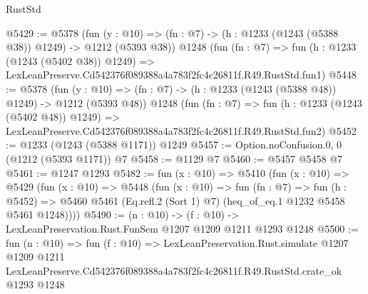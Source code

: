 \begin{lexlean}{RustStd}
\begin{coremodule}
@5429 := @5378
    (fun (y : @10) => (fn : @7) -> (h : @1233 (@1243 (@5388 @38)) @1249) -> @1212 (@5393 @38))
    @1248
    (fun (fn : @7) =>
    fun (h : @1233 (@1243 (@5402 @38)) @1249) =>
    LexLeanPreserve.Cd542376f089388a4a783f2fc4c26811f.R49.RustStd.fun1)
@5448 := @5378
    (fun (y : @10) => (fn : @7) -> (h : @1233 (@1243 (@5388 @48)) @1249) -> @1212 (@5393 @48))
    @1248
    (fun (fn : @7) =>
    fun (h : @1233 (@1243 (@5402 @48)) @1249) =>
    LexLeanPreserve.Cd542376f089388a4a783f2fc4c26811f.R49.RustStd.fun2)
@5452 := @1233 (@1243 (@5388 @1171)) @1249
@5457 := Option.noConfusion.{0, 0} (@1212 (@5393 @1171)) @7
@5458 := @1129 @7
@5460 := @5457 @5458 @7
@5461 := @1247 @1293
@5482 := fun (x : @10) =>
  @5410
    (fun (x : @10) =>
    @5429
      (fun (x : @10) =>
      @5448
        (fun (x : @10) =>
        fun (fn : @7) =>
        fun (h : @5452) =>
        @5460 @5461 (Eq.refl.{2} (Sort 1) @7) (heq_of_eq.{1} @1232 @5458 @5461 @1248))))
@5490 := (n : @10) -> (f : @10) -> LexLeanPreservation.Rust.FunSem @1207 @1209 @1211 @1293 @1248
@5500 := fun (n : @10) =>
  fun (f : @10) =>
  LexLeanPreservation.Rust.simulate
    @1207
    @1209
    @1211
    LexLeanPreserve.Cd542376f089388a4a783f2fc4c26811f.R49.RustStd.crate_ok
    @1293
    @1248
\end{coremodule}
\end{lexlean}

